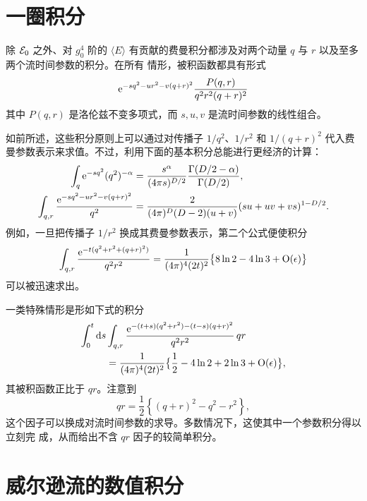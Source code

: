 \section{一圈积分}\label{app:B}

除 ${\cal E}_0$ 之外、对 $g_0^4$ 阶的 $\langle E\rangle$
有贡献的费曼积分都涉及对两个动量 $q$ 与 $r$ 以及至多两个流时间参数的积分。在所有
情形，被积函数都具有形式
\begin{equation}
  \mathrm{e}^{-sq^2-ur^2-v(q+r)^2}{P(q,r)\over q^2r^2(q+r)^2}
\end{equation}
其中 $P(q,r)$ 是洛伦兹不变多项式，而 $s,u,v$
是流时间参数的线性组合。

如前所述，这些积分原则上可以通过对传播子 $1/q^2$、$1/r^2$ 和 $1/(q+r)^2$
代入费曼参数表示来求值。不过，利用下面的基本积分总能进行更经济的计算：
\begin{align}
  \int_q\mathrm{e}^{-sq^2}(q^2)^{-\alpha}&={s^{\alpha}\over(4\pi s)^{D/2}}
  {\Gamma(D/2-\alpha)\over\Gamma(D/2)},
  \\
  \int_{q,r}{\mathrm{e}^{-sq^2-ur^2-v(q+r)^2}\over q^2}&=
  {2\over(4\pi)^D(D-2)(u+v)}(su+uv+vs)^{1-D/2}.
  \label{eq:basicintegralB}
\end{align}
例如，一旦把传播子 $1/r^2$ 换成其费曼参数表示，第二个公式便使积分
\begin{equation}
  \int_{q,r}
  {\mathrm{e}^{-t(q^2+r^2+(q+r)^2)}\over q^2r^2}=
  {1\over(4\pi)^4(2t)^2}\bigl\{8\ln2-4\ln3+\mathrm{O}(\epsilon)\bigr\}
\end{equation}
可以被迅速求出。

一类特殊情形是形如下式的积分
\begin{equation}
\begin{split}
  \int_0^t\mathrm{d} s&\int_{q,r}
  {\mathrm{e}^{-(t+s)(q^2+r^2)-(t-s)(q+r)^2}\over q^2r^2}\,
  qr\\
  &={1\over(4\pi)^4(2t)^2}\bigl\{\frac{1}{2}-4\ln2+2\ln3+\mathrm{O}(\epsilon)\bigr\},
\end{split}
\end{equation}
其被积函数正比于 $qr$。注意到
\begin{equation}
  qr=\frac{1}{2}\left\{(q+r)^2-q^2-r^2\right\},
\end{equation}
这个因子可以换成对流时间参数的求导。多数情况下，这使其中一个参数积分得以立刻完
成，从而给出不含 $qr$ 因子的较简单积分。


\section{威尔逊流的数值积分}\label{app:C}

